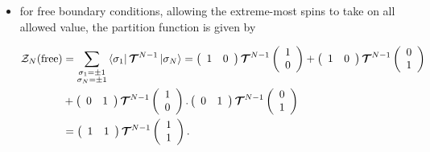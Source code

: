 \documentclass{homework}
\begin{document}
\begin{itemize}
    \item for free boundary conditions, allowing the extreme-most spins to take on all allowed value, the partition function is given by 
    
    \begin{equation}
    \begin{split}
     \mathcal{Z}_N(\textnormal{free}) &= \sum_{\substack{\sigma_1 = \pm 1\\
    \sigma_N = \pm 1}} \bra{\sigma_1} \bm{\mathcal{T}}^{N-1} \ket{\sigma_N} =  \left(\begin{array}{cc}
        1 & 0 \\
    \end{array}\right) \bm{\mathcal{T}}^{N-1} \left(\begin{array}{c}
        1 \\
        0
    \end{array}\right) +\left(\begin{array}{cc}
        1 & 0 \\
    \end{array}\right) \bm{\mathcal{T}}^{N-1} \left(\begin{array}{c}
        0 \\
        1
    \end{array}\right) \\
    & + \left(\begin{array}{cc}
        0 & 1 \\
    \end{array}\right) \bm{\mathcal{T}}^{N-1} \left(\begin{array}{c}
        1 \\
        0 
    \end{array}\right).
    \left(\begin{array}{cc}
        0 & 1 \\
    \end{array}\right) \bm{\mathcal{T}}^{N-1} \left(\begin{array}{c}
        0 \\
        1 
    \end{array}\right)
    \\
    &= \left(\begin{array}{cc}
        1 & 1 \\
    \end{array}\right) \bm{\mathcal{T}}^{N-1} \left(\begin{array}{c}
        1 \\
        1 
    \end{array}\right).
    \end{split}
    \label{Ising model - Free PF}
    \end{equation}
    

\end{itemize}
\end{document}

